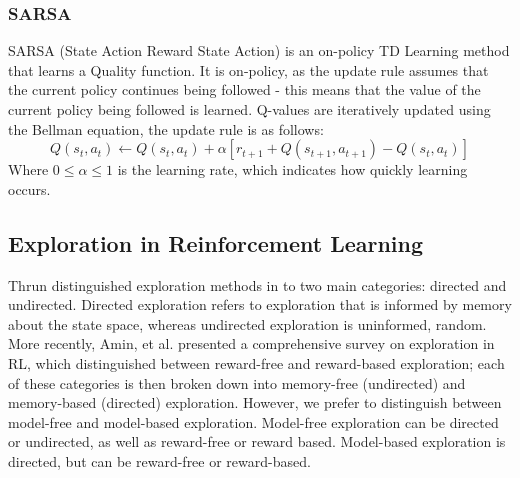 \subsubsection{SARSA}
SARSA (State Action Reward State Action) \cite{rummery:cuedtr94} is an on-policy TD Learning method that learns a Quality function. It is on-policy, as the update rule assumes that the current policy continues being followed - this means that the value of the current policy being followed is learned. Q-values are iteratively updated using the Bellman equation, the update rule is as follows:
\begin{equation}
\label{eqn:sarsaupdate}
Q(s_t, a_t) \leftarrow Q(s_t, a_t) + \alpha[r_{t+1} + Q(s_{t+1}, a_{t+1})-Q(s_t, a_t)]
\end{equation}
Where $0 \le \alpha \le 1$ is the learning rate, which indicates how quickly learning occurs.
\subsection{Exploration in Reinforcement Learning}
Thrun \cite{Thrun-1992-15850} distinguished exploration methods in to two main categories: directed and undirected. Directed exploration refers to exploration that is informed by memory about the state space, whereas undirected exploration is uninformed, random. More recently, Amin, et al. \cite{DBLP:journals/corr/abs-2109-00157} presented a comprehensive survey on exploration in RL, which distinguished between reward-free and reward-based exploration; each of these categories is then broken down into memory-free (undirected) and memory-based (directed) exploration. However, we prefer to distinguish between model-free and model-based exploration. Model-free exploration can be directed or undirected, as well as reward-free or reward based. Model-based exploration is directed, but can be reward-free or reward-based.

